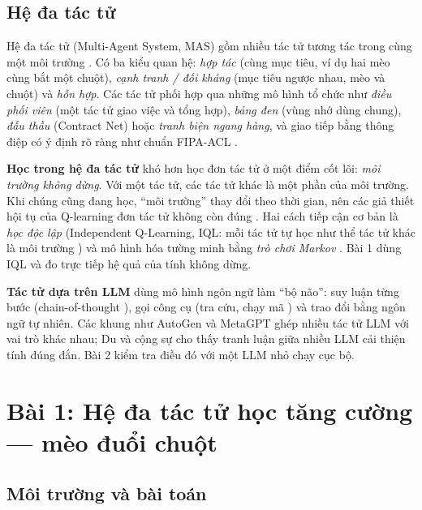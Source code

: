 \subsection{Hệ đa tác tử}

Hệ đa tác tử (Multi-Agent System, MAS) gồm nhiều tác tử tương tác trong cùng một môi trường \cite{wooldridge2009,jennings1998}. Có ba kiểu quan hệ: \emph{hợp tác} (cùng mục tiêu, ví dụ hai mèo cùng bắt một chuột), \emph{cạnh tranh / đối kháng} (mục tiêu ngược nhau, mèo và chuột) và \emph{hỗn hợp}. Các tác tử phối hợp qua những mô hình tổ chức như \emph{điều phối viên} (một tác tử giao việc và tổng hợp), \emph{bảng đen} (vùng nhớ dùng chung), \emph{đấu thầu} (Contract Net) hoặc \emph{tranh biện ngang hàng}, và giao tiếp bằng thông điệp có ý định rõ ràng như chuẩn FIPA-ACL \cite{fipa2002}.

\textbf{Học trong hệ đa tác tử} khó hơn học đơn tác tử ở một điểm cốt lõi: \emph{môi trường không dừng}. Với một tác tử, các tác tử khác là một phần của môi trường. Khi chúng cũng đang học, ``môi trường'' thay đổi theo thời gian, nên các giả thiết hội tụ của Q-learning đơn tác tử không còn đúng \cite{busoniu2008}. Hai cách tiếp cận cơ bản là \emph{học độc lập} (Independent Q-Learning, IQL: mỗi tác tử tự học như thể tác tử khác là môi trường \cite{tan1993}) và mô hình hóa tường minh bằng \emph{trò chơi Markov} \cite{littman1994}. Bài 1 dùng IQL và đo trực tiếp hệ quả của tính không dừng.

\textbf{Tác tử dựa trên LLM} dùng mô hình ngôn ngữ làm ``bộ não'': suy luận từng bước (chain-of-thought \cite{wei2022cot}), gọi công cụ (tra cứu, chạy mã \cite{gao2023pal}) và trao đổi bằng ngôn ngữ tự nhiên. Các khung như AutoGen \cite{wu2023autogen} và MetaGPT \cite{hong2024metagpt} ghép nhiều tác tử LLM với vai trò khác nhau; Du và cộng sự \cite{du2024debate} cho thấy tranh luận giữa nhiều LLM cải thiện tính đúng đắn. Bài 2 kiểm tra điều đó với một LLM nhỏ chạy cục bộ.

\section{Bài 1: Hệ đa tác tử học tăng cường — mèo đuổi chuột}
\label{sec:ch7-catmouse}

\subsection{Môi trường và bài toán}


